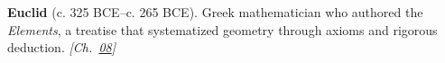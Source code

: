 \textbf{Euclid} (c. 325 BCE–c. 265 BCE). Greek mathematician who authored the \emph{Elements}, a treatise that systematized geometry through axioms and rigorous deduction. \emph{[Ch.~\hyperref[ch:boundedprimegaps]{08}]}

